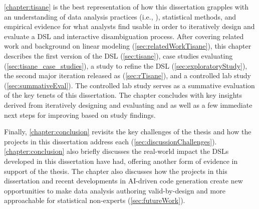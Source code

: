 \autoref{chapter:tisane} is the best representation of how this dissertation
grapples with an understanding of data analysis practices (i.e., \hypoForm),
statistical methods, and empirical evidence for what analysts find usable in
order to iteratively design and evaluate a DSL and interactive disambiguation
process. After covering related work and background on linear modeling
(\autoref{sec:relatedWorkTisane}), this chapter describes the first version of
the \tisane DSL (\autoref{sec:tisane}), case studies evaluating \tisane
(\autoref{sec:tisane_case_studies}), a study to refine the DSL
(\autoref{sec:exploratoryStudy}), the second major iteration released as
\rTisane (\autoref{sec:rTisane}), and a controlled lab study
(\autoref{sec:summativeEval}). The controlled lab study serves as a summative
evaluation of the key tenets of this dissertation. The chapter concludes with
key insights derived from iteratively designing and evaluating \tisane and
\rTisane as well as a few immediate next steps for improving \rTisane based on
study findings.


Finally, \autoref{chapter:conclusion} revisits the key challenges of the thesis
and how the projects in this dissertation address each
(\autoref{sec:discussionChallenges}). \autoref{chapter:conclusion} also briefly
discusses the real-world impact the DSLs developed in this dissertation have
had, offering another form of evidence in support of the thesis. The chapter
also discusses how the projects in this dissertation and recent developments in
AI-driven code generation create new opportunities to make data analysis authoring valid-by-design and more approachable for statistical non-experts (\autoref{sec:futureWork}). 


\begin{comment}
\todo{Fill in this outline}

\section*{How to approach this dissertation} \todo{Decide if want to keep}

\section{Prior Publication and Authorship} \todo{fill in}
\end{comment}